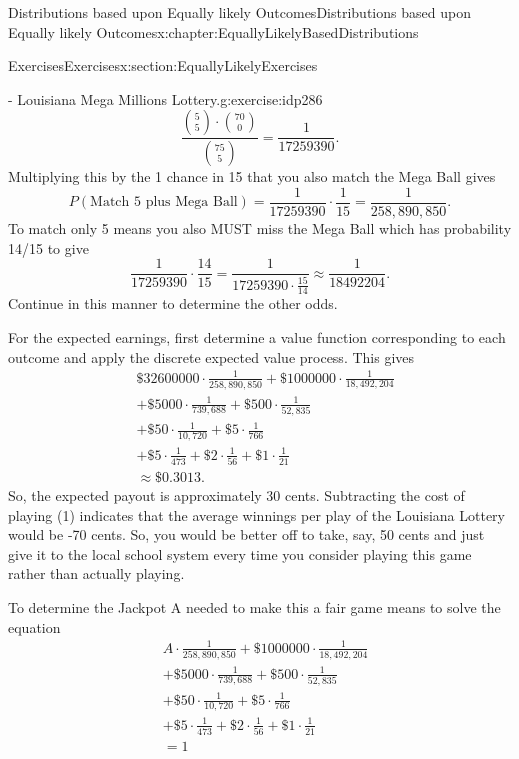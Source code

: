 \documentclass[oneside,10pt,]{book}
\numberwithin{equation}{section}
\begin{document}
\begin{chapterptx}{Distributions based upon Equally likely Outcomes}{}{Distributions based upon Equally likely Outcomes}{}{}{x:chapter:EquallyLikelyBasedDistributions}
\begin{sectionptx}{Exercises}{}{Exercises}{}{}{x:section:EquallyLikelyExercises}
\begin{inlineexercise}{- Louisiana Mega Millions Lottery.}{g:exercise:idp286}
\begin{equation*}
\frac{\binom{5}{5} \cdot \binom{70}{0}}{\binom{75}{5}} = \frac{1}{17259390}.
\end{equation*}
Multiplying this by the 1 chance in 15 that you also match the Mega Ball gives%
\begin{equation*}
P(\text{Match 5 plus Mega Ball}) = \frac{1}{17259390} \cdot \frac{1}{15} = \frac{1}{258,890,850}.
\end{equation*}
To match only 5 means you also MUST miss the Mega Ball which has probability 14\slash{}15 to give%
\begin{equation*}
\frac{1}{17259390} \cdot \frac{14}{15} = \frac{1}{17259390 \cdot \frac{15}{14}} \approx \frac{1}{18492204}.
\end{equation*}
Continue in this manner to determine the other odds.%
\par
For the expected earnings, first determine a value function corresponding to each outcome and apply the discrete expected value process. This gives%
\begin{align*}
& \$32600000 \cdot \frac{1}{258,890,850} + \$1000000 \cdot \frac{1}{18,492,204} \\
& + \$5000 \cdot \frac{1}{739,688} + \$500 \cdot \frac{1}{52,835}\\
& + \$50 \cdot \frac{1}{10,720} + \$5 \cdot \frac{1}{766} \\
& + \$5 \cdot \frac{1}{473} + \$2 \cdot \frac{1}{56} + \$1 \cdot \frac{1}{21}\\
& \approx \$0.3013.
\end{align*}
So, the expected payout is approximately 30 cents. Subtracting the cost of playing (\textdollar{}1) indicates that the average winnings per play of the Louisiana Lottery would be -70 cents. So, you would be better off to take, say, 50 cents and just give it to the local school system every time you consider playing this game rather than actually playing.%
\par
To determine the Jackpot A needed to make this a fair game means to solve the equation%
\begin{align*}
& A \cdot \frac{1}{258,890,850} + \$1000000 \cdot \frac{1}{18,492,204} \\
& + \$5000 \cdot \frac{1}{739,688} + \$500 \cdot \frac{1}{52,835}\\
& + \$50 \cdot \frac{1}{10,720} + \$5 \cdot \frac{1}{766} \\
& + \$5 \cdot \frac{1}{473} + \$2 \cdot \frac{1}{56} + \$1 \cdot \frac{1}{21}\\
& = 1
\end{align*}

\end{inlineexercise}
\end{sectionptx}
\end{chapterptx}
\end{document}
